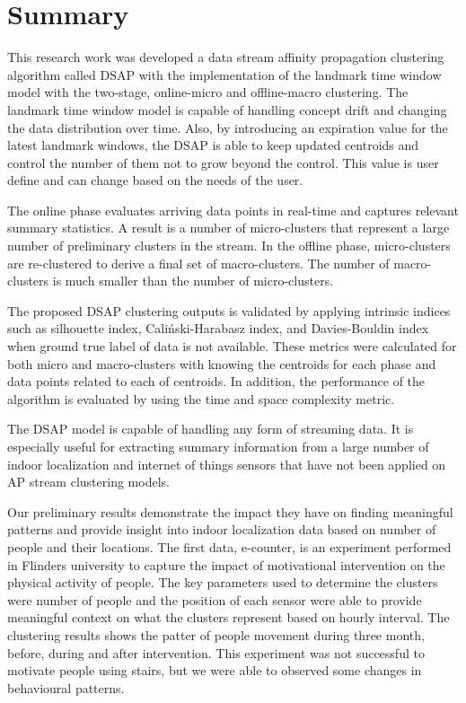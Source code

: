 \section{Summary}
This research work was developed a data stream affinity propagation clustering algorithm called DSAP with the implementation of the landmark time window model with the two-stage, online-micro and offline-macro clustering. The landmark time window model is capable of handling concept drift and changing the data distribution over time. Also, by introducing an expiration value for the latest landmark windows, the DSAP is able to keep updated centroids and control the number of them not to grow beyond the control. This value is user define and can change based on the needs of the user.

The online phase evaluates arriving data points in real-time and captures
relevant summary statistics. A result is a number of micro-clusters that represent a large number of
preliminary clusters in the stream. In the offline phase, micro-clusters are re-clustered to derive a final set of macro-clusters. The number of macro-clusters is much smaller than the number of micro-clusters.

The proposed DSAP clustering outputs is validated by applying intrinsic indices such as silhouette index, Caliński-Harabasz index, and Davies-Bouldin index when ground true label of data is not available. These metrics were calculated for both micro and macro-clusters with knowing the centroids for each phase and data points related to each of centroids.
In addition, the performance of the algorithm is evaluated by using the time and space complexity metric. 


The DSAP model is capable of handling any form of streaming data. It is especially useful for extracting summary information from a large number of indoor localization and internet of things sensors that have not been applied on AP stream clustering models.

Our preliminary results demonstrate the impact they have on finding meaningful patterns and provide insight into indoor localization data based on number of people and their locations. The first data, e-counter, is an experiment performed in Flinders university to capture the impact of motivational intervention on the physical activity of people. The key parameters used to determine the clusters were number of people and the position of each sensor were able to provide meaningful context on what the clusters represent based on hourly interval. The clustering results shows the patter of people movement during three month, before, during and after intervention. This experiment was not successful to motivate people using stairs, but we were able to observed some changes in behavioural patterns. 

